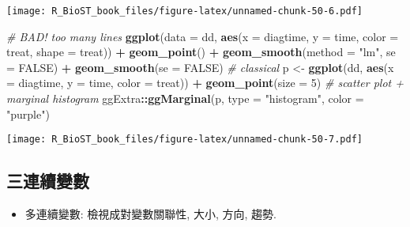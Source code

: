 \documentclass[
]{book}
\newenvironment{Shaded}{\begin{snugshade}}{\end{snugshade}}
\newcommand{\CommentTok}[1]{\textcolor[rgb]{0.56,0.35,0.01}{\textit{#1}}}
\newcommand{\DataTypeTok}[1]{\textcolor[rgb]{0.13,0.29,0.53}{#1}}
\newcommand{\DecValTok}[1]{\textcolor[rgb]{0.00,0.00,0.81}{#1}}
\newcommand{\KeywordTok}[1]{\textcolor[rgb]{0.13,0.29,0.53}{\textbf{#1}}}
\newcommand{\NormalTok}[1]{#1}
\newcommand{\OperatorTok}[1]{\textcolor[rgb]{0.81,0.36,0.00}{\textbf{#1}}}
\newcommand{\OtherTok}[1]{\textcolor[rgb]{0.56,0.35,0.01}{#1}}
\newcommand{\StringTok}[1]{\textcolor[rgb]{0.31,0.60,0.02}{#1}}
\providecommand{\tightlist}{%
  \setlength{\itemsep}{0pt}\setlength{\parskip}{0pt}}
\begin{document}
\texttt{[image: R\_BioST\_book\_files/figure-latex/unnamed-chunk-50-6.pdf]}

\begin{Shaded}
\begin{Highlighting}[]
\CommentTok{\# BAD! too many lines}
\KeywordTok{ggplot}\NormalTok{(}\DataTypeTok{data =}\NormalTok{ dd, }\KeywordTok{aes}\NormalTok{(}\DataTypeTok{x =}\NormalTok{ diagtime, }\DataTypeTok{y =}\NormalTok{ time,}
                      \DataTypeTok{color =}\NormalTok{ treat, }\DataTypeTok{shape =}\NormalTok{ treat)) }\OperatorTok{+}\StringTok{ }
\StringTok{  }\KeywordTok{geom\_point}\NormalTok{() }\OperatorTok{+}\StringTok{ }
\StringTok{  }\KeywordTok{geom\_smooth}\NormalTok{(}\DataTypeTok{method =} \StringTok{"lm"}\NormalTok{, }\DataTypeTok{se =} \OtherTok{FALSE}\NormalTok{) }\OperatorTok{+}\StringTok{ }
\StringTok{  }\KeywordTok{geom\_smooth}\NormalTok{(}\DataTypeTok{se =} \OtherTok{FALSE}\NormalTok{)}
\CommentTok{\# classical}
\NormalTok{p \textless{}{-}}\StringTok{ }\KeywordTok{ggplot}\NormalTok{(dd, }\KeywordTok{aes}\NormalTok{(}\DataTypeTok{x =}\NormalTok{ diagtime, }\DataTypeTok{y =}\NormalTok{ time, }\DataTypeTok{color =}\NormalTok{ treat)) }\OperatorTok{+}
\StringTok{      }\KeywordTok{geom\_point}\NormalTok{(}\DataTypeTok{size =} \DecValTok{5}\NormalTok{) }
\CommentTok{\# scatter plot + marginal histogram}
\NormalTok{ggExtra}\OperatorTok{::}\KeywordTok{ggMarginal}\NormalTok{(p, }\DataTypeTok{type =} \StringTok{"histogram"}\NormalTok{, }\DataTypeTok{color =} \StringTok{"purple"}\NormalTok{)}
\end{Highlighting}
\end{Shaded}

\texttt{[image: R\_BioST\_book\_files/figure-latex/unnamed-chunk-50-7.pdf]}

\hypertarget{ux4e09ux9023ux7e8cux8b8aux6578}{%
\subsection{三連續變數}\label{ux4e09ux9023ux7e8cux8b8aux6578}}

\begin{itemize}
\tightlist
\item
  多連續變數: 檢視成對變數關聯性, 大小, 方向, 趨勢.
\end{itemize}
\end{document}
